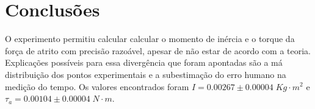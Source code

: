 \documentclass[12pt,a4paper]{article}
\begin{document}
\section{Conclusões}
O experimento permitiu calcular calcular o momento de inércia e o torque da força de atrito com precisão razoável, apesar de não estar de acordo com a teoria. Explicações possíveis para essa divergência que foram apontadas são a má distribuição dos pontos experimentais e a subestimação do erro humano na medição do tempo. Os valores encontrados foram $  I = 0.00267 \pm 0.00004 \; Kg \cdot m^2 $ e $  \tau_a =  0.00104 \pm 0.00004 \; N \cdot m $.
\end{document}
